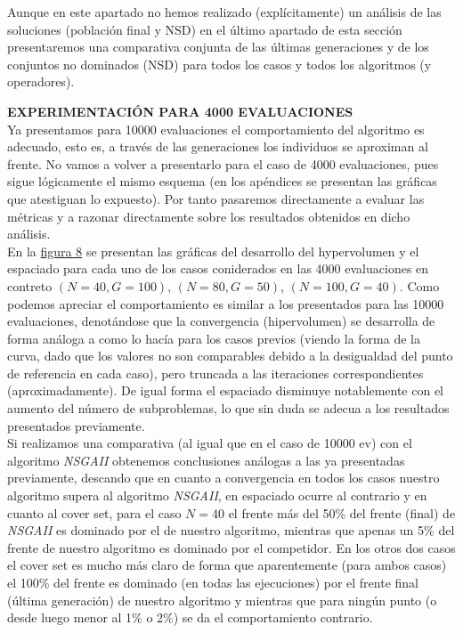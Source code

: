 Aunque en este apartado no hemos realizado (explícitamente) un análisis de las soluciones (población final y NSD) en el último apartado de esta sección presentaremos una comparativa conjunta de las últimas generaciones y de los conjuntos no dominados (NSD) para todos los casos y todos los algoritmos (y operadores).

\noindent\textbf{EXPERIMENTACIÓN PARA 4000 EVALUACIONES}\\

Ya presentamos para 10000 evaluaciones el comportamiento del algoritmo es adecuado, esto es, a través de las generaciones los individuos se aproximan al frente. No vamos a volver a presentarlo para el caso de 4000 evaluaciones, pues sigue lógicamente el mismo esquema (en los apéndices se presentan las gráficas que atestiguan lo expuesto). Por tanto pasaremos directamente a evaluar las métricas y a razonar directamente sobre los resultados obtenidos en dicho análisis.  \\

En la \hyperref[fig:8]{figura 8} se presentan las gráficas del desarrollo del hypervolumen y el espaciado para cada uno de los casos coniderados en las 4000 evaluaciones en contreto $(N=40, G=100)$, $(N=80, G=50)$, $(N=100, G=40)$. Como podemos apreciar el comportamiento es similar a los presentados para las 10000 evaluaciones, denotándose que la convergencia (hipervolumen) se desarrolla de forma análoga a como lo hacía para los casos previos (viendo la forma de la curva, dado que los valores no son comparables debido a la desigualdad del punto de referencia en cada caso), pero truncada a las iteraciones correspondientes (aproximadamente). De igual forma el espaciado disminuye notablemente con el aumento del número de subproblemas, lo que sin duda se adecua a los resultados presentados previamente.\\

Si realizamos una comparativa (al igual que en el caso de 10000 ev) con el algoritmo \textit{NSGAII} obtenemos conclusiones análogas a las ya presentadas previamente, descando que en cuanto a convergencia en todos los casos nuestro algoritmo supera al algoritmo \textit{NSGAII}, en espaciado ocurre al contrario y en cuanto al cover set, para el caso $N=40$ el frente más del 50\%   del frente (final) de \textit{NSGAII} es dominado por el de nuestro algoritmo, mientras que apenas un 5\% del frente de nuestro algoritmo es dominado por el competidor. En los otros dos casos el cover set es mucho más claro de forma que aparentemente (para ambos casos) el 100\% del frente es dominado (en todas las ejecuciones) por el frente final (última generación) de nuestro algoritmo y mientras que para ningún punto (o desde luego menor al 1\% o 2\%) se da el comportamiento contrario.\\

